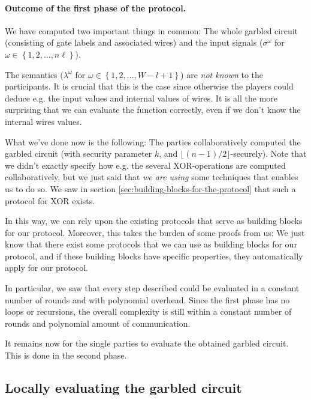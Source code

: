 \message{ !name(seminar.tex)}\documentclass{llncs}
\begin{document}
\paragraph{Outcome of the first phase of the protocol.}

We have computed two important things in common: The whole garbled circuit (consisting of gate labels and associated wires) and the input signals ($\sigma^\omega$ for $\omega\in\left\{ 1,2,\dots,n\ell \right\}$).

The semantics ($\lambda^\omega$ for $\omega\in\left\{ 1,2,\dots,W-l+1 \right\}$) are \emph{not known} to the participants. It is crucial that this is the case since otherwise the players could deduce e.g. the input values and internal values of wires. It is all the more surprising that we can evaluate the function correctly, even if we don't know the internal wires values.

What we've done now is the following: The parties collaboratively computed the garbled circuit (with security parameter $k$, and $\lfloor (n-1)/2 \rfloor$-securely). Note that we didn't exactly specify how e.g. the several XOR-operations are computed collaboratively, but we just said that \emph{we are using} some techniques that enables us to do so. We saw in section \ref{sec:building-blocks-for-the-protocol} that such a protocol for XOR exists.

In this way, we can rely upon the existing protocols that serve as building blocks for our protocol. Moreover, this takes the burden of some proofs from us: We just know that there exist some protocols that we can use as building blocks for our protocol, and if these building blocks have specific properties, they automatically apply for our protocol. 

In particular, we saw that every step described could be evaluated in a constant number of rounds and with polynomial overhead. Since the first phase has no loops or recursions, the overall complexity is still within a constant number of rounds and polynomial amount of communication.

It remains now for the single parties to evaluate the obtained garbled circuit. This is done in the second phase.

\subsection{Locally evaluating the garbled circuit}
\label{sec:protocoll-locally-evaluating-garbled-circuit}
\end{document}

